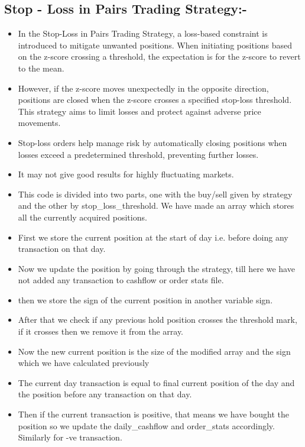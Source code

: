\documentclass[11pt]{article}
\begin{document}
\subsection{Stop - Loss in Pairs Trading Strategy:-}
\begin{itemize}
    \item In the Stop-Loss in Pairs Trading Strategy, a loss-based constraint is introduced to mitigate unwanted positions. When initiating positions based on the z-score crossing a threshold, the expectation is for the z-score to revert to the mean. 
    \item However, if the z-score moves unexpectedly in the opposite direction, positions are closed when the z-score crosses a specified stop-loss threshold. This strategy aims to limit losses and protect against adverse price movements.
    \item Stop-loss orders help manage risk by automatically closing positions when losses exceed a predetermined threshold, preventing further losses.
    \item It may not give good results for highly fluctuating markets.
    \item This code is divided into two parts, one with the buy/sell given by strategy and the other by stop\_loss\_threshold. We have made an array which stores all the currently acquired positions.
    \item First we store the current position at the start of day i.e. before doing any transaction on that day.
    \item Now we update the position by going through the strategy, till here we have not added any transaction to cashflow or order stats file.
    \item then we store the sign of the current position in another variable sign.
    \item After that we check if any previous hold position crosses the threshold mark, if it crosses then we remove it from the array.
    \item Now the new current position is the size of the modified array and the sign which we have calculated previously
    \item The current day transaction is equal to final current position of the day and the position before any transaction on that day.
    \item Then if the current transaction is positive, that means we have bought the position so we update the daily\_cashflow and order\_stats accordingly. Similarly for -ve transaction.
    
\end{itemize}
\end{document}
